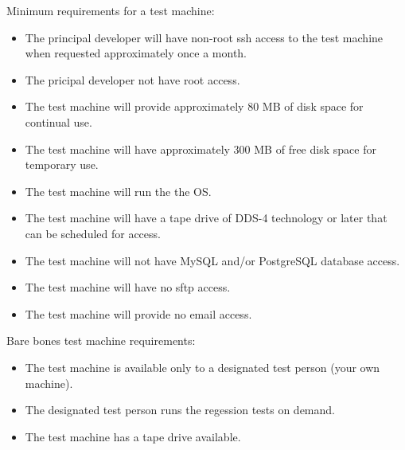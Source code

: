 Minimum requirements for a test machine:
\begin{itemize}
\item The principal developer will have non-root ssh access to
  the test machine when requested approximately once a month.
\item The pricipal developer not have root access.
\item The test machine will provide approximately 80 MB of
  disk space for continual use.
\item The test machine will have approximately 300 MB of free
  disk space for temporary use.
\item The test machine will run the the OS.
\item The test machine will have a tape drive of DDS-4 technology
  or later that can be scheduled for access.
\item The test machine will not have MySQL and/or PostgreSQL database
  access.
\item The test machine will have no sftp access.
\item The test machine will provide no email access.
\end{itemize}

Bare bones test machine requirements:
\begin{itemize}
\item The test machine is available only to a designated
  test person (your own machine).
\item The designated test person runs the regession
  tests on demand.
\item The test machine has a tape drive available.
\end{itemize}

